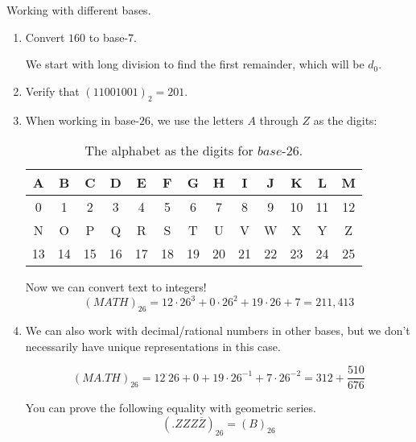 \begin{example} Working with different bases.
\begin{enumerate}[(1)]
\item Convert $160$ to base-$7$.

We start with long division to find the first remainder, which will be $d_0$.


\item Verify that $(11001001)_2 = 201$.

\item When working in base-$26$, we use the letters $A$ through $Z$ as the digits:

\begin{table}[!h]\label{tab:base26digits}
\centering
\begin{small}
\begin{tabular}{|c|c|c|c|c|c|c|c|c|c|c|c|c|}
\hline
 A & B & C & D & E & F & G & H & I& J & K & L &M  \\
 \hline
0 & 1& 2 & 3 & 4 & 5 & 6 & 7 & 8 & 9 & 10 & 11 & 12 \\
\hline
\hline
N&O&P&Q&R&S&T&U&V&W&X&Y&Z\\
\hline
13 & 14 & 15 & 16 & 17 & 18 & 19 & 20 & 21 & 22 & 23 & 24 & 25\\
\hline
\end{tabular}
\caption{The alphabet as the digits for $base$-26.}
\end{small}
\end{table}

Now we can convert text to integers! \[
(MATH)_26 = 12\cdot 26^3 + 0 \cdot 26^2 + 19\cdot26 + 7 = 211,413 \]

\item We can also work with decimal/rational numbers in other bases, but we don't necessarily have unique representations in this case.

\[(MA.TH)_26 = 12^\cdot 26 + 0 + 19 \cdot 26^{-1} + 7 \cdot 26^{-2} = 312 + \frac{510}{676}\]

You can prove the following equality with geometric series.
\[(.ZZZ\overline{Z})_26 = (B)_26\]

\end{enumerate}
\end{example}

